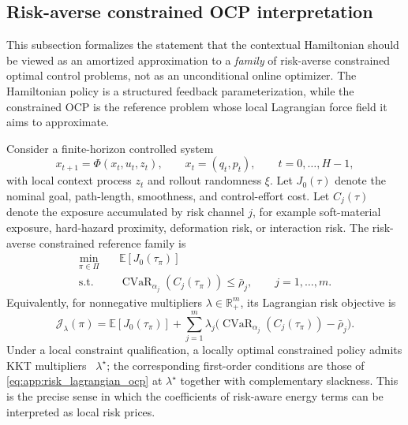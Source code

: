 \subsection{Risk-averse constrained OCP interpretation}
\label{app:risk_constrained_ocp}

This subsection formalizes the statement that the contextual Hamiltonian should be
viewed as an amortized approximation to a \emph{family} of risk-averse constrained
optimal control problems, not as an unconditional online optimizer. The Hamiltonian
policy is a structured feedback parameterization, while the constrained OCP is the
reference problem whose local Lagrangian force field it aims to approximate.

Consider a finite-horizon controlled system
\begin{equation}
    x_{t+1}=\Phi(x_t,u_t,z_t),
    \qquad x_t=(q_t,p_t),
    \qquad t=0,\dots,H-1,
    \label{eq:app:discrete_ocp_dynamics}
\end{equation}
with local context process $z_t$ and rollout randomness $\xi$. Let $J_0(\tau)$ denote
the nominal goal, path-length, smoothness, and control-effort cost. Let
$C_j(\tau)$ denote the exposure accumulated by risk channel $j$, for example
soft-material exposure, hard-hazard proximity, deformation risk, or interaction risk.
The risk-averse constrained reference family is
\begin{equation}
\begin{aligned}
    \min_{\pi\in\Pi}\quad
    & \mathbb E[J_0(\tau_\pi)] \\
    \mathrm{s.t.}\quad
    & \operatorname{CVaR}_{\alpha_j}(C_j(\tau_\pi))
      \le \bar\rho_j,
      \qquad j=1,\dots,m .
\end{aligned}
\label{eq:app:risk_constrained_ocp}
\end{equation}
Equivalently, for nonnegative multipliers $\lambda\in\mathbb R_+^m$, its Lagrangian
risk objective is
\begin{equation}
    \mathcal J_\lambda(\pi)
    =
    \mathbb E[J_0(\tau_\pi)]
    +
    \sum_{j=1}^m
    \lambda_j
    \bigl(
      \operatorname{CVaR}_{\alpha_j}(C_j(\tau_\pi))-\bar\rho_j
    \bigr).
    \label{eq:app:risk_lagrangian_ocp}
\end{equation}
Under a local constraint qualification, a locally optimal constrained policy admits
KKT multipliers~\citep{ShapiroDentchevaRuszczynski2009} $\lambda^\star$; the corresponding first-order conditions are those of
\eqref{eq:app:risk_lagrangian_ocp} at $\lambda^\star$ together with complementary
slackness. This is the precise sense in which the coefficients of risk-aware energy
terms can be interpreted as local risk prices.

